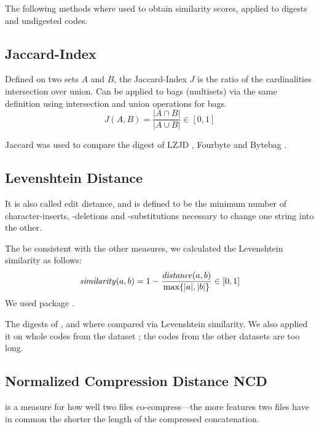 \documentclass[../main.tex]{subfiles}
\begin{document}
The following methods where used to obtain similarity scores, applied to digests and undigested codes.

\subsection{Jaccard-Index \label{sec:jacc}}

Defined on two sets $A$ and $B$, the Jaccard-Index $J$ is the ratio of the cardinalities intersection over union. Can be applied to bags (multisets) via the same definition using intersection and union operations for bags.
\begin{equation}
  J(A,B) = \dfrac{|A \cap B|}{|A \cup B|} \in [0,1]
  \label{eq:jaccard}
\end{equation}

Jaccard was used to compare the digest of LZJD , Fourbyte  and Bytebag .

\subsection{Levenshtein Distance \label{sec:lev}}

It is also called edit distance, and is defined to be the minimum number of character-inserts, -deletions and -substitutions necessary to change one string into the other.

The be consistent with the other measures, we calculated the Levenshtein similarity as follows:
\begin{equation}
  \mbox{\textit{similarity}}(a, b) = 1 - \dfrac{\mbox{\textit{distance}}(a, b)}{\max\{|a|, |b|\}} \in [0,1]
  \label{eq:levSim}
\end{equation}
We used  package \cite{pyLev}.

The digests of  ,   and   where compared via Levenshtein similarity. We also applied it on whole codes from the  dataset ; the codes from the other datasets are too long.

\subsection{Normalized Compression Distance NCD \label{sec:ncd}}

 is a measure for how well two files co-compress---the more features two files have in common the shorter the length of the compressed concatenation.
\end{document}
